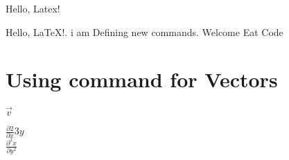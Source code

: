 \documentclass{article}
\newcommand{\hello}{Hello, Latex!}
\newcommand{\greet}[2]{Hello, #1!. i am Defining new commands. Welcome #2}
\newcommand{\vect}[1]{\vec{#1}}
\newcommand{\pdo}[2]{\displaystyle \frac{\partial #1}{\partial #2}}
\newcommand{\pdt}[2]{\displaystyle \frac{\partial ^2 #1}{\partial #2^2}}
\begin{document}
\hello


\greet{\LaTeX}{Eat Code}
\section*{Using command for Vectors}
$\vect{v}$

$\pdo 2x3y$ \\
\centering
$\pdt xy$
\end{document}
